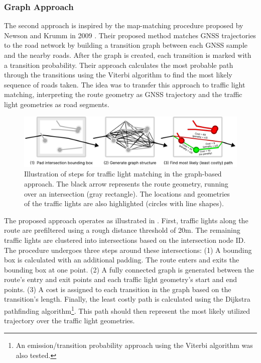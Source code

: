 \subsubsection{Graph Approach}

The second approach is inspired by the map-matching procedure proposed by Newson and Krumm in 2009 \cite{newson_hidden_2009}. Their proposed method matches GNSS trajectories to the road network by building a transition graph between each GNSS sample and the nearby roads. After the graph is created, each transition is marked with a transition probability. Their approach calculates the most probable path through the transitions using the Viterbi algorithm to find the most likely sequence of roads taken. The idea was to transfer this approach to traffic light matching, interpreting the route geometry as GNSS trajectory and the traffic light geometries as road segments.

\begin{figure}[t]
\centering
\includegraphics[width=\linewidth]{images/sg-selection-graph-approach.pdf}
\caption{Illustration of steps for traffic light matching in the graph-based approach. The black arrow represents the route geometry, running over an intersection (gray rectangle). The locations and geometries of the traffic lights are also highlighted (circles with line shapes).}
\label{fig:sg-selection-graph-approach}
\end{figure}

The proposed approach operates as illustrated in . First, traffic lights along the route are prefiltered using a rough distance threshold of 20m. The remaining traffic lights are clustered into intersections based on the intersection node ID. The procedure undergoes three steps around these intersections: (1) A bounding box is calculated with an additional padding. The route enters and exits the bounding box at one point. (2) A fully connected graph is generated between the route's entry and exit points and each traffic light geometry's start and end points. (3) A cost is assigned to each transition in the graph based on the transition's length. Finally, the least costly path is calculated using the Dijkstra pathfinding algorithm\footnote{An emission/transition probability approach using the Viterbi algorithm was also tested.}. This path should then represent the most likely utilized trajectory over the traffic light geometries.

